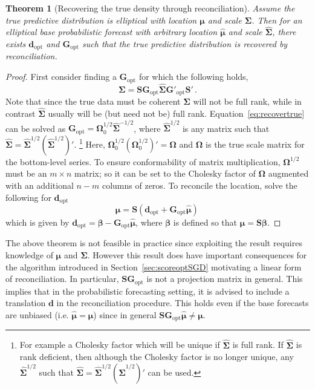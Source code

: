 \documentclass[a4paper,12pt]{article}
\newtheorem{theo}{Theorem}[section]
\theoremstyle{definition}
\begin{document}
\begin{theo}[Recovering the true density through reconciliation]\label{theo:OptRec}
	Assume the true predictive distribution is elliptical with location ${\bm\mu}$ and scale ${\bm\Sigma}$. Then for an elliptical base probabilistic forecast with arbitrary location $\hat{\bm\mu}$ and scale $\hat{\bm\Sigma}$, there exists $\bm{d}_{\text{opt}}$ and $\bm{G}_{\text{opt}}$ such that the true predictive distribution is recovered by reconciliation.
\end{theo}
\begin{proof}
	First consider finding a $\bm{G}_{\text{opt}}$ for which the following holds,
	\begin{equation}
	\label{eq:recovertrue}
	\bm{\Sigma}=\bm{S}\bm{G}_{\text{opt}}\hat{\bm{\Sigma}}\bm{G}'_{\text{opt}}\bm{S}'\,.
	\end{equation}
	Note that since the true data must be coherent $\bm{\Sigma}$ will not be full rank, while in contrast $\hat{\bm{\Sigma}}$ usually will be (but need not be) full rank. Equation~\eqref{eq:recovertrue} can be solved as $\bm{G}_{\text{opt}}=\bm{\Omega}_0^{1/2}\hat{\bm{\Sigma}}^{-1/2}$, where $\hat{\bm{\Sigma}}^{1/2}$ is any matrix such that $\hat{\bm{\Sigma}}=\hat{\bm{\Sigma}}^{1/2}(\hat{\bm{\Sigma}}^{1/2})'$. \footnote{For example a Cholesky factor which will be unique if $\hat{\bm{\Sigma}}$ is full rank.  If $\hat{\bm{\Sigma}}$ is rank deficient, then although the Cholesky factor is no longer unique, any $\hat{\bm{\Sigma}}^{1/2}$ such that $\hat{\bm{\Sigma}}=\hat{\bm{\Sigma}}^{1/2}(\hat{\bm{\Sigma}}^{1/2})'$ can be used.} Here, ${\bm{\Omega}}_0^{1/2}({\bm{\Omega}}_0^{1/2})'={\bm\Omega}$ and ${\bm\Omega}$ is the true scale matrix for the bottom-level series. To ensure conformability of matrix multiplication, ${\bm{\Omega}}^{1/2}$ must be an $m\times n$ matrix; so it can be set to the Cholesky factor of ${\bm{\Omega}}$ augmented with an additional $n-m$ columns of zeros. To reconcile the location, solve the following for $\bm{d}_{\text{opt}}$
	\begin{equation*}
	\bm{\mu}=\bm{S}(\bm{d}_{\text{opt}}+\bm{G}_{\text{opt}}\hat{\bm{\mu}})\,
	\end{equation*}
	which is given by $\bm{d}_{\text{opt}}=\bm{\beta}-\bm{G}_{\text{opt}}\hat{\bm\mu}$, where $\bm{\beta}$ is defined so that $\bm{\mu}=\bm{S}\bm{\beta}$.
\end{proof}

The above theorem is not feasible in practice since exploiting the result requires knowledge of $\bm{\mu}$ and $\bm{\Sigma}$.  However this result does have important consequences for the algorithm introduced in Section~\ref{sec:scoreoptSGD} motivating a linear form of reconciliation. In particular, $\bm{S}\bm{G}_{\text{opt}}$ is not a projection matrix in general. This implies that in the probabilistic forecasting setting, it is advised to include a translation $\bm{d}$ in the reconciliation procedure. This holds even if the base forecasts are unbiased (i.e. $\hat{\bm{\mu}}=\bm{\mu}$) since in general $\bm{S}\bm{G}_{\text{opt}}\hat{\bm{\mu}}\neq\bm{\mu}$.
\end{document}
